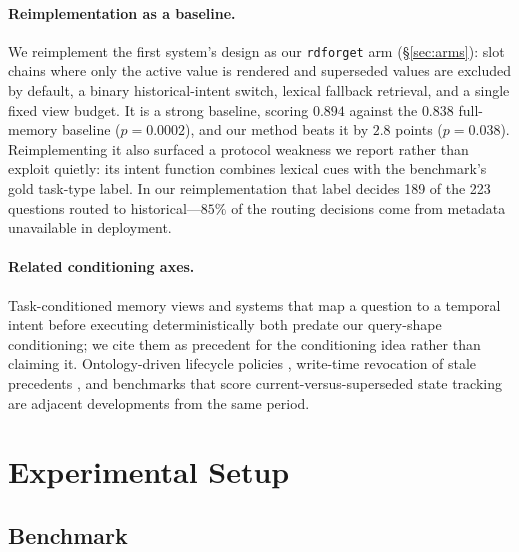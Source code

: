\documentclass[11pt]{article}
\newcommand{\arm}[1]{\texttt{#1}}
\begin{document}
\paragraph{Reimplementation as a baseline.} We reimplement the first system's design as our \arm{rdforget} arm (\S\ref{sec:arms}): slot chains where only the active value is rendered and superseded values are excluded by default, a binary historical-intent switch, lexical fallback retrieval, and a single fixed view budget. It is a strong baseline, scoring $0.894$ against the $0.838$ full-memory baseline ($p = 0.0002$), and our method beats it by $2.8$ points ($p = 0.038$). Reimplementing it also surfaced a protocol weakness we report rather than exploit quietly: its intent function combines lexical cues with the benchmark's gold task-type label. In our reimplementation that label decides 189 of the 223 questions routed to historical---$85\%$ of the routing decisions come from metadata unavailable in deployment.

\paragraph{Related conditioning axes.} Task-conditioned memory views \citep{memprism} and systems that map a question to a temporal intent before executing deterministically \citep{stair} both predate our query-shape conditioning; we cite them as precedent for the conditioning idea rather than claiming it. Ontology-driven lifecycle policies \citep{fortunaterecall}, write-time revocation of stale precedents \citep{tepa}, and benchmarks that score current-versus-superseded state tracking \citep{statemembench} are adjacent developments from the same period.

\section{Experimental Setup}
\label{sec:setup}

\subsection{Benchmark}
\end{document}
